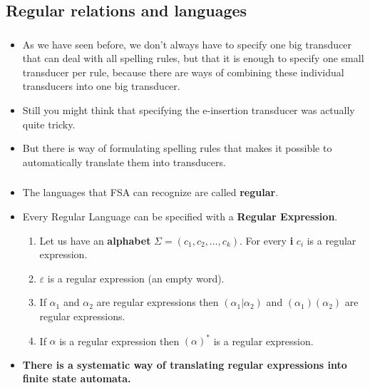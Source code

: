 \subsection{Regular relations and languages}


\begin{frame}

	\frametitle{\insertsection}
	\framesubtitle{\insertsubsection}
	
	\begin{itemize}
		\item As we have seen before, we don't always have to specify one big transducer that can deal with all spelling rules, but that it is enough to specify one small transducer per rule, because there are ways of combining these individual transducers into one big transducer.
		\item Still you might think that specifying the e-insertion transducer was actually quite tricky.
		\item But there is way of formulating spelling rules that makes it possible to automatically translate them into transducers.
	\end{itemize}

\end{frame}


\begin{frame}

	\frametitle{\insertsection}
	\framesubtitle{\insertsubsection}
	
	\begin{itemize}
		\item The languages that FSA can recognize are called \textbf{regular}.
		\item Every Regular Language can be specified with a \textbf{Regular Expression}.
		\begin{enumerate}
			\item Let us have an \textbf{alphabet} \(\Sigma = (c_1,c_2,\ldots,c_k) \). For every \textbf{i} \(c_i\) is a regular expression.
			\item \(\varepsilon \) is a regular expression (an empty word).
			\item If \(\alpha_1 \) and \(\alpha_2 \) are regular expressions then \((\alpha_1 | \alpha_2) \) and \((\alpha_1)(\alpha_2) \) are
			regular expressions.
			\item If \(\alpha \) is a regular expression then \((\alpha)^{*} \) is a regular expression.
		\end{enumerate}
		\item \textbf{There is a systematic way of translating regular expressions into finite state automata.}
	\end{itemize}

\end{frame}


